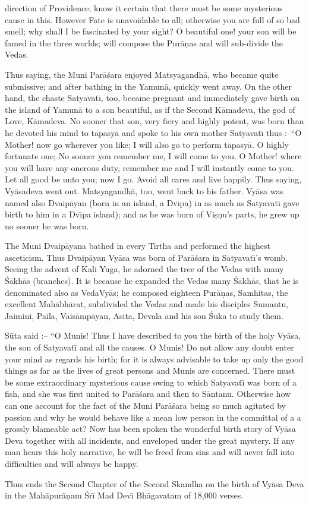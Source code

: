 direction of Providence; know it certain that there must be some mysterious cause in this. However Fate is unavoidable to all; otherwise you are full of so bad smell; why shall I be fascinated by your sight? O beautiful one! your son will be famed in the three worlds; will compose the Pur\=a\d{n}as and will sub-divide the Vedas.

Thus saying, the Muni Par\=a\'sara enjoyed Matsyagandh\=a, who became quite submissive; and after bathing in the Yamun\=a, quickly went away. On the other hand, the chaste Satyavat\={\i}, too, became pregnant and immediately gave birth on the island of Yamun\=a to a son beautiful, as if the Second K\=amadeva, the god of Love, K\=amadeva. No sooner that son, very fiery and highly potent, was born than he devoted his mind to tapasy\=a and spoke to his own mother Satyavat\={\i} thus :--``O Mother! now go wherever you like; I will also go to perform tapasy\=a. O highly fortunate one; No sooner you remember me, I will come to you. O Mother! where you will have any onerous duty, remember me and I will instantly come to you. Let all good be unto you; now I go. Avoid all cares and live happily. Thus saying, Vy\=asadeva went out. Matsyagandh\=a, too, went back to his father. Vy\=asa was named also Dvaip\=ayan (born in an island, a Dv\={\i}pa) in as much as Satyavat\={\i} gave birth to him in a Dv\={\i}pa island); and as he was born of Vi\d{s}\d{n}u's parts, he grew up no sooner he was born.

The Muni Dvaip\=ayana bathed in every T\={\i}rtha and performed the highest asceticism. Thus Dvaip\=ayan Vy\=asa was born of Par\=a\'sara in Satyavat\={\i}'s womb. Seeing the advent of Kali Yuga, he adorned the tree of the Vedas with many \'S\=akh\=as (branches). It is because he expanded the Vedas many \'S\=akh\=as, that he is denominated also as VedaVy\=as; he composed eighteen Pur\=a\d{n}as, Samhitas, the excellent Mah\=abh\=arat, subdivided the Vedas and made his disciples Sumantu, Jaimini, Paila, Vais\=amp\=ayan, Asita, Devala and his son \'Suka to study them.

S\=uta said :-- ``O Munis! Thus I have described to you the birth of the holy Vy\=asa, the son of Satyavat\={\i} and all the causes. O Munis! Do not allow any doubt enter your mind as regards his birth; for it is always advisable to take up only the good things as far as the lives of great persons and Munis are concerned. There must be some extraordinary mysterious cause owing to which Satyavat\={\i} was born of a fish, and she was first united to Par\=a\'sara and then to S\=antanu. Otherwise how can one account for the fact of the Muni Par\=a\'sara being so much agitated by passion and why he would behave like a mean low person in the committal of a a grossly blameable act? Now has been spoken the wonderful birth story of Vy\=asa Deva together with all incidents, and enveloped under the great mystery. If any man hears this holy narrative, he will be freed from sins and will never fall into difficulties and will always be happy.

Thus ends the Second Chapter of the Second Skandha on the birth of Vy\=asa Deva in the Mah\=apur\=a\d{n}am \'Sr\={\i} Mad Dev\={\i} Bh\=agavatam of 18,000 verses.



